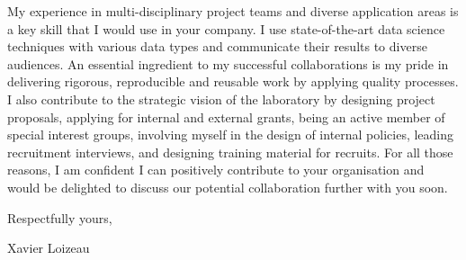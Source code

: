 \documentclass[12pt]{article}
\begin{document}
\medskip

My experience in multi-disciplinary project teams and diverse application areas is a key skill that I would use in your company.
I use state-of-the-art data science techniques with various data types and communicate their results to diverse audiences.
An essential ingredient to my successful collaborations is my pride in delivering rigorous, reproducible and reusable work by applying quality processes.
I also contribute to the strategic vision of the laboratory by designing project proposals, applying for internal and external grants, being an active member of special interest groups, involving myself in the design of internal policies, leading recruitment interviews, and designing training material for recruits.
For all those reasons, I am confident I can positively contribute to your organisation and would be delighted to discuss our potential collaboration further with you soon.

\medskip

Respectfully yours,

Xavier Loizeau

\vfill%
\end{document}
